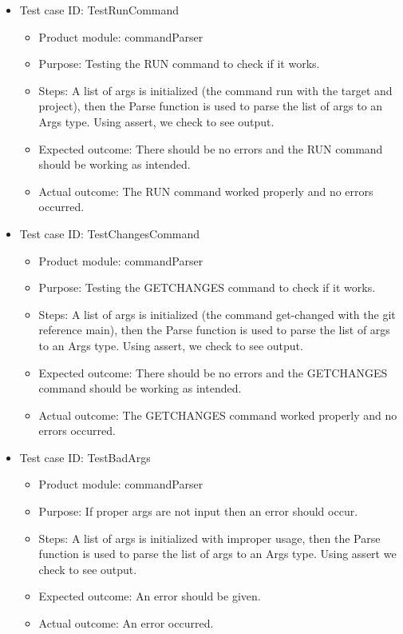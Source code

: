 \documentclass[11pt]{article}
\begin{document}
\begin{itemize}
    \item Test case ID: TestRunCommand
    \begin{itemize}
        \item Product module: commandParser
        \item Purpose: Testing the RUN command to check if it works.
        \item Steps: A list of args is initialized (the command run with the target and project), then the Parse function is used to parse the list of args to an Args type. Using assert, we check to see output.
        \item Expected outcome: There should be no errors and the RUN command should be working as intended.
        \item Actual outcome: The RUN command worked properly and no errors occurred.
    \end{itemize}
\end{itemize}

\begin{itemize}
    \item Test case ID: TestChangesCommand
    \begin{itemize}
        \item Product module: commandParser
        \item Purpose: Testing the GETCHANGES command to check if it works.
        \item Steps: A list of args is initialized (the command get-changed with the git reference main), then the Parse function is used to parse the list of args to an Args type. Using assert, we check to see output.
        \item Expected outcome: There should be no errors and the GETCHANGES command should be working as intended.
        \item Actual outcome:  The GETCHANGES command worked properly and no errors occurred.
    \end{itemize}
\end{itemize}

\begin{itemize}
    \item Test case ID: TestBadArgs
    \begin{itemize}
        \item Product module: commandParser
        \item Purpose: If proper args are not input then an error should occur.
        \item Steps: A list of args is initialized with improper usage, then the Parse function is used to parse the list of args to an Args type. Using assert we check to see output.
        \item Expected outcome: An error should be given.
        \item Actual outcome: An error occurred.
    \end{itemize}
\end{itemize}
\end{document}

